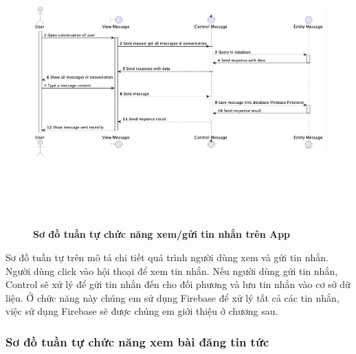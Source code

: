   \begin{figure}[H]
        \centering
        \includegraphics[width=16cm,height=11cm]{Images/mobile_app/send_and_receive_message.png}
        \caption[Sơ đồ tuần tự chức năng xem/gửi tin nhắn trên App]{\bfseries \fontsize{12pt}{0pt}
        \selectfont Sơ đồ tuần tự chức năng xem/gửi tin nhắn trên App}
        \label{send_and_receive_message} %
  \end{figure}

  Sơ đồ tuần tự trên mô tả chi tiết quá trình người dùng xem và gửi tin nhắn. Người dùng click vào hội thoại để xem tin nhắn. 
  Nếu người dùng gửi tin nhắn, Control sẽ xử lý để gửi tin nhắn đến cho đối phương và lưu tin nhắn vào cơ sở dữ liệu. Ở chức năng
  này chúng em sử dụng Firebase để xử lý tất cả các tin nhắn, việc sử dụng Firebase sẽ được chúng em giới thiệu ở chương sau.

\subsubsection{Sơ đồ tuần tự chức năng xem bài đăng tin tức}
\mbox{}

